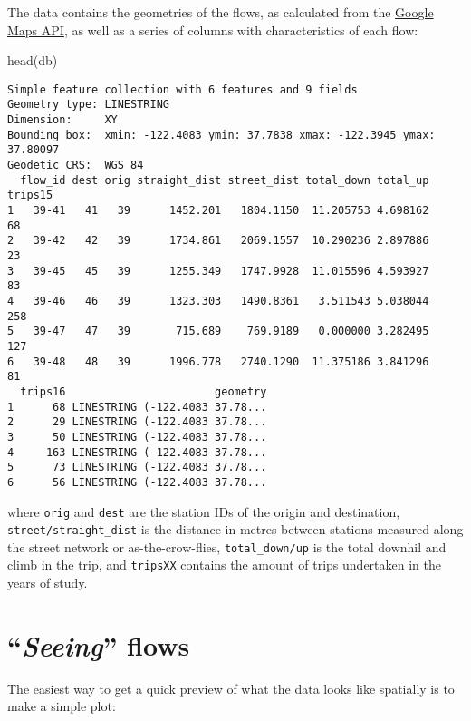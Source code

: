 \documentclass[
  letterpaper,
  krantz2]{style/krantz}
\newenvironment{Shaded}{\begin{snugshade}}{\end{snugshade}}
\newcommand{\FunctionTok}[1]{\textcolor[rgb]{0.28,0.35,0.67}{#1}}
\newcommand{\NormalTok}[1]{\textcolor[rgb]{0.00,0.23,0.31}{#1}}
\newcommand{\SpecialCharTok}[1]{\textcolor[rgb]{0.37,0.37,0.37}{#1}}
\begin{document}
The data contains the geometries of the flows, as calculated from the
\href{https://developers.google.com/maps/}{Google Maps API}, as well as
a series of columns with characteristics of each flow:

\begin{Shaded}
\begin{Highlighting}[]
\FunctionTok{head}\NormalTok{(db)}
\end{Highlighting}
\end{Shaded}

\begin{verbatim}
Simple feature collection with 6 features and 9 fields
Geometry type: LINESTRING
Dimension:     XY
Bounding box:  xmin: -122.4083 ymin: 37.7838 xmax: -122.3945 ymax: 37.80097
Geodetic CRS:  WGS 84
  flow_id dest orig straight_dist street_dist total_down total_up trips15
1   39-41   41   39      1452.201   1804.1150  11.205753 4.698162      68
2   39-42   42   39      1734.861   2069.1557  10.290236 2.897886      23
3   39-45   45   39      1255.349   1747.9928  11.015596 4.593927      83
4   39-46   46   39      1323.303   1490.8361   3.511543 5.038044     258
5   39-47   47   39       715.689    769.9189   0.000000 3.282495     127
6   39-48   48   39      1996.778   2740.1290  11.375186 3.841296      81
  trips16                       geometry
1      68 LINESTRING (-122.4083 37.78...
2      29 LINESTRING (-122.4083 37.78...
3      50 LINESTRING (-122.4083 37.78...
4     163 LINESTRING (-122.4083 37.78...
5      73 LINESTRING (-122.4083 37.78...
6      56 LINESTRING (-122.4083 37.78...
\end{verbatim}

where \texttt{orig} and \texttt{dest} are the station IDs of the origin
and destination, \texttt{street/straight\_dist} is the distance in
metres between stations measured along the street network or
as-the-crow-flies, \texttt{total\_down/up} is the total downhil and
climb in the trip, and \texttt{tripsXX} contains the amount of trips
undertaken in the years of study.

\hypertarget{seeing-flows}{%
\section{\texorpdfstring{``\emph{Seeing}''
flows}{``Seeing'' flows}}\label{seeing-flows}}

The easiest way to get a quick preview of what the data looks like
spatially is to make a simple plot:

\begin{Shaded}
\end{Shaded}
\end{document}
